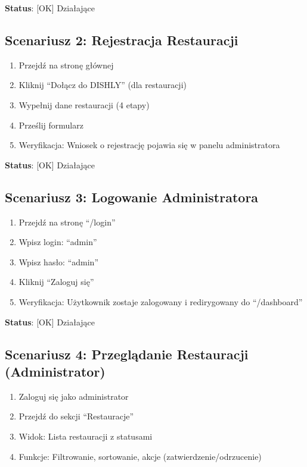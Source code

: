 \documentclass[12pt,a4paper,utf-8]{article}
\begin{document}
\textbf{Status}: [OK] Działające

\subsection{Scenariusz 2: Rejestracja Restauracji}

\begin{enumerate}
    \item Przejdź na stronę głównej
    \item Kliknij ``Dołącz do DISHLY'' (dla restauracji)
    \item Wypełnij dane restauracji (4 etapy)
    \item Prześlij formularz
    \item Weryfikacja: Wniosek o rejestrację pojawia się w panelu administratora
\end{enumerate}

\textbf{Status}: [OK] Działające

\subsection{Scenariusz 3: Logowanie Administratora}

\begin{enumerate}
    \item Przejdź na stronę ``/login''
    \item Wpisz login: ``admin''
    \item Wpisz hasło: ``admin''
    \item Kliknij ``Zaloguj się''
    \item Weryfikacja: Użytkownik zostaje zalogowany i redirygowany do ``/dashboard''
\end{enumerate}

\textbf{Status}: [OK] Działające

\subsection{Scenariusz 4: Przeglądanie Restauracji (Administrator)}

\begin{enumerate}
    \item Zaloguj się jako administrator
    \item Przejdź do sekcji ``Restauracje''
    \item Widok: Lista restauracji z statusami
    \item Funkcje: Filtrowanie, sortowanie, akcje (zatwierdzenie/odrzucenie)
\end{enumerate}
\end{document}
